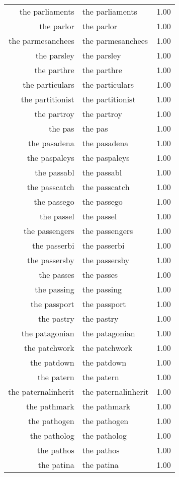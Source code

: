 \begin{table}[ht]
\begin{tabular}{rlr}
  the parliaments & the parliaments & 1.00 \\ 
  the parlor & the parlor & 1.00 \\ 
  the parmesanchees & the parmesanchees & 1.00 \\ 
  the parsley & the parsley & 1.00 \\ 
  the parthre & the parthre & 1.00 \\ 
  the particulars & the particulars & 1.00 \\ 
  the partitionist & the partitionist & 1.00 \\ 
  the partroy & the partroy & 1.00 \\ 
  the pas & the pas & 1.00 \\ 
  the pasadena & the pasadena & 1.00 \\ 
  the paspaleys & the paspaleys & 1.00 \\ 
  the passabl & the passabl & 1.00 \\ 
  the passcatch & the passcatch & 1.00 \\ 
  the passego & the passego & 1.00 \\ 
  the passel & the passel & 1.00 \\ 
  the passengers & the passengers & 1.00 \\ 
  the passerbi & the passerbi & 1.00 \\ 
  the passersby & the passersby & 1.00 \\ 
  the passes & the passes & 1.00 \\ 
  the passing & the passing & 1.00 \\ 
  the passport & the passport & 1.00 \\ 
  the pastry & the pastry & 1.00 \\ 
  the patagonian & the patagonian & 1.00 \\ 
  the patchwork & the patchwork & 1.00 \\ 
  the patdown & the patdown & 1.00 \\ 
  the patern & the patern & 1.00 \\ 
  the paternalinherit & the paternalinherit & 1.00 \\ 
  the pathmark & the pathmark & 1.00 \\ 
  the pathogen & the pathogen & 1.00 \\ 
  the patholog & the patholog & 1.00 \\ 
  the pathos & the pathos & 1.00 \\ 
  the patina & the patina & 1.00 \\ 

\end{tabular}
\end{table}
